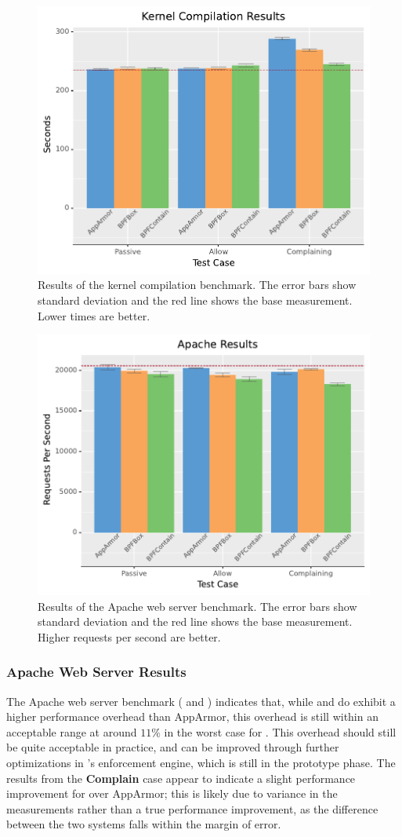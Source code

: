 \begin{figure}[htp]
  \centering
  \includegraphics[width=0.6\linewidth]{results/graphs/Kernel-Compilation.pdf}
  \caption[Results of the kernel compilation benchmark]{
    Results of the kernel compilation benchmark.
    The error bars show standard deviation and the red line shows the base measurement.
    Lower times are better.
  }%
  \label{fig:phoronix-kernel}
\end{figure}

\begin{figure}[htp]
  \centering
  \includegraphics[width=0.6\linewidth]{results/graphs/Apache.pdf}
  \caption[Results of the Apache web server benchmark]{
    Results of the Apache web server benchmark.
    The error bars show standard deviation and the red line shows the base measurement.
    Higher requests per second are better.
  }%
  \label{fig:phoronix-apache}
\end{figure}


\subsubsection{Apache Web Server Results}

The Apache web server benchmark ( and ) indicates that, while
\bpfbox{} and \bpfcontain{} do exhibit a higher performance overhead than AppArmor, this
overhead is still within an acceptable range at around $11\%$ in the worst case for
\bpfcontain{}. This overhead should still be quite acceptable in practice, and can be
improved through further optimizations in \bpfcontain{}'s enforcement engine, which is
still in the prototype phase. The results from the \textbf{Complain} case appear to
indicate a slight performance improvement for \bpfbox{} over AppArmor; this is likely due
to variance in the measurements rather than a true performance improvement, as the
difference between the two systems falls within the margin of error.

